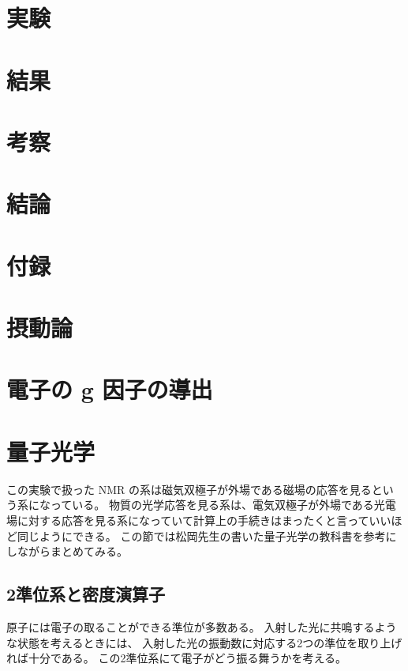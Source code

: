 \documentclass[11pt,dvipdfmx,a4paper]{jsarticle}
\begin{document}
\section{実験}

\section{結果}

\section{考察}

\section{結論}





\section*{付録}
\section{摂動論}%

\section{電子の g 因子の導出}

\section{量子光学}
この実験で扱った NMR の系は磁気双極子が外場である磁場の応答を見るという系になっている。
物質の光学応答を見る系は、電気双極子が外場である光電場に対する応答を見る系になっていて計算上の手続きはまったくと言っていいほど同じようにできる。
この節では松岡先生の書いた量子光学の教科書\cite{Matsuoka_2000}を参考にしながらまとめてみる。
\subsection{2準位系と密度演算子}
原子には電子の取ることができる準位が多数ある。
入射した光に共鳴するような状態を考えるときには、
入射した光の振動数に対応する2つの準位を取り上げれば十分である。
この2準位系にて電子がどう振る舞うかを考える。
\end{document}
